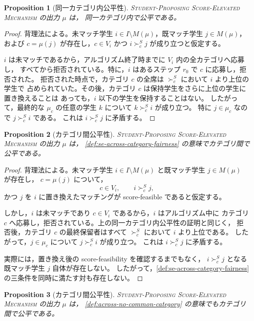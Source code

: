 \documentclass[
  12pt,
  a4paper,
  oneside,
  onecolumn,
  titlepage,
  final
]{jsarticle}
\newtheorem{proposition}{Proposition}
\newcommand{\1}{\mathbf{1}}
\begin{document}
\begin{proposition}[同一カテゴリ内公平性]
\label{prop:se-within-fair}
\textsc{Student-Proposing Score-Elevated Mechanism} の出力 $\mu$ は，
同一カテゴリ内で公平である。
\end{proposition}

\begin{proof}
背理法による。未マッチ学生 $i\in I\setminus M(\mu)$，既マッチ学生 $j\in M(\mu)$，
および $c=\mu(j)$ が存在し，$c\in V_i$ かつ $i\succ_c^S j$ が成り立つと仮定する。

$i$ は未マッチであるから，アルゴリズム終了時までに $V_i$ 内の全カテゴリへ応募し，
すべてから拒否されている。特に，$i$ はあるステップ $r_0$ で $c$ に応募し，拒否された。
拒否された時点で，カテゴリ $c$ の全席は $\succ_c^S$ において $i$ より上位の学生で
占められていた。その後，カテゴリ $c$ は保持学生をさらに上位の学生に置き換えることは
あっても，$i$ 以下の学生を保持することはない。
したがって，最終的な $\mu_c$ の任意の学生 $k$ について $k\succ_c^S i$ が成り立つ。
特に $j\in\mu_c$ なので $j\succ_c^S i$ である。
これは $i\succ_c^S j$ に矛盾する。
\end{proof}

\begin{proposition}[カテゴリ間公平性]
\label{prop:se-across-fair}
\textsc{Student-Proposing Score-Elevated Mechanism} の出力 $\mu$ は，
\cref{def:se-across-category-fairness} の意味でカテゴリ間で公平である。
\end{proposition}

\begin{proof}
背理法による。未マッチ学生 $i\in I\setminus M(\mu)$ と既マッチ学生 $j\in M(\mu)$ が存在し，
$c=\mu(j)$ について，
\[
    c\in V_i,
    \qquad
    i\succ_c^S j,
\]
かつ $j$ を $i$ に置き換えたマッチングが score-feasible であると仮定する。

しかし，$i$ は未マッチであり $c\in V_i$ であるから，$i$ はアルゴリズム中に
カテゴリ $c$ へ応募し，拒否されている。上の同一カテゴリ内公平性の証明と同じく，
拒否後，カテゴリ $c$ の最終保留者はすべて $\succ_c^S$ において $i$ より上位である。
したがって，$j\in\mu_c$ について $j\succ_c^S i$ が成り立つ。
これは $i\succ_c^S j$ に矛盾する。

実際には，置き換え後の score-feasibility を確認するまでもなく，
$i\succ_c^S j$ となる既マッチ学生 $j$ 自体が存在しない。
したがって，\cref{def:se-across-category-fairness} の三条件を同時に満たす対も存在しない。
\end{proof}

\begin{proposition}[カテゴリ間公平性]
\label{prop:se-across-no-common}
\textsc{Student-Proposing Score-Elevated Mechanism} の出力 $\mu$ は，
\cref{def:across-no-common-category} の意味でもカテゴリ間で公平である。
\end{proposition}
\end{document}
